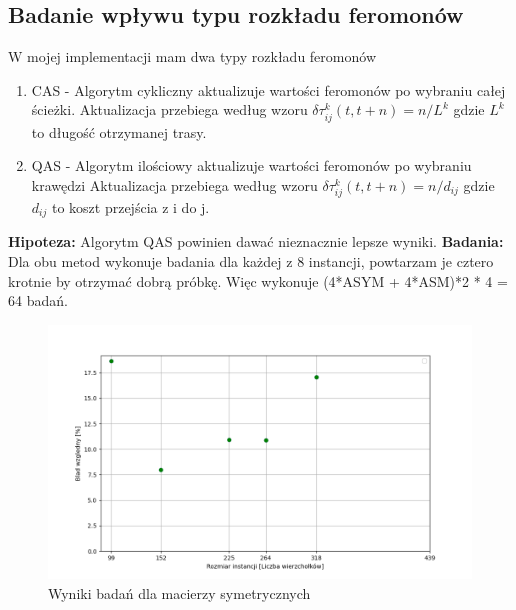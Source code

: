\documentclass{article}
\begin{document}
      \subsection{Badanie wpływu typu rozkładu feromonów}
        W mojej implementacji mam dwa typy rozkładu feromonów
        \begin{enumerate}
          \item CAS - Algorytm cykliczny aktualizuje wartości feromonów po 
          wybraniu całej ścieżki. Aktualizacja przebiega według wzoru 
          $\delta \tau_{ij}^k(t,t+n) = n/L^k$ gdzie $L^k$ to długość otrzymanej trasy.
          \item QAS - Algorytm ilościowy aktualizuje wartości feromonów po 
          wybraniu krawędzi Aktualizacja przebiega według wzoru 
          $\delta \tau_{ij}^k(t,t+n) = n/d_{ij}$ gdzie $d_{ij}$ to koszt przejścia
          z i do j.\linebreak
        \end{enumerate}
        \textbf{Hipoteza: } Algorytm QAS powinien dawać nieznacznie lepsze wyniki.\linebreak
        \textbf{Badania: } Dla obu metod wykonuje badania dla każdej z 8 
        instancji, powtarzam je cztero krotnie by otrzymać dobrą próbkę.
        Więc wykonuje (4*ASYM + 4*ASM)*2 * 4 = 64 badań.\linebreak
        \FloatBarrier
        
        \FloatBarrier
        \begin{figure}[ht]
          \centering
          \includegraphics[width=\textwidth]{src/plots/symAoFeroMet.png}
          \caption{Wyniki badań dla macierzy symetrycznych}
          \label{fig:symFero}
        \end{figure}
\end{document}
